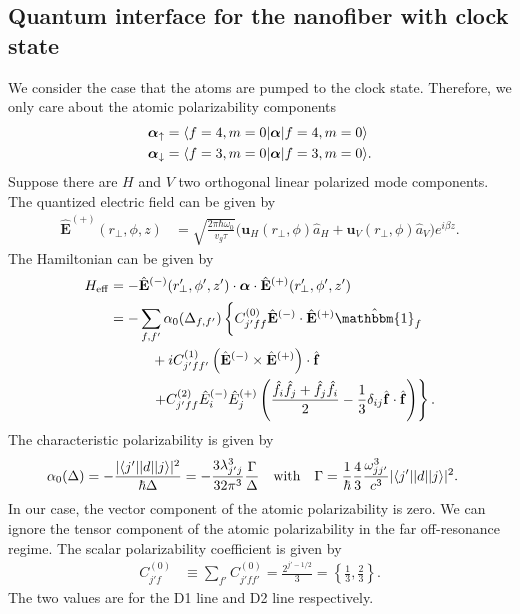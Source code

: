 \documentclass[preprint,aps,pra,onecolumn]{revtex4-1} %
\renewcommand{\tensor}[1]{\boldsymbol{#1}}
\begin{document}
\subsection{Quantum interface for the nanofiber with clock state}
We consider the case that the atoms are pumped to the clock state. Therefore, we only care about the atomic polarizability components
\begin{align}
\tensor{\alpha}_{\uparrow} &=\bra{f=4,m=0}\tensor{\alpha}\ket{f=4,m=0}\\
\tensor{\alpha}_{\downarrow} &=\bra{f=3,m=0}\tensor{\alpha}\ket{f=3,m=0}.
\end{align}
Suppose there are $H$ and $V$ two orthogonal linear polarized mode components. The quantized electric field can be given by
\begin{align}
\hat{\mathbf{E}}^{(+)}(r\!_\perp,\phi,z) &= \sqrt{ \frac{2 \pi \hbar \omega_0}{ v_g \tau} } \big( \mathbf{u}_H(r\!_\perp,\phi) \hat{a}_H + \mathbf{u}_V(r\!_\perp,\phi) \hat{a}_V \big) e^{i \beta z}.
\end{align}
The Hamiltonian can be given by
\begin{align}
H_{\rm eff}   &= -\hat{\mathbf{E}}^{(-)}(r^\prime\!\!_\perp,\phi',z')\cdot \tensor{\alpha}\cdot \hat{\mathbf{E}}^{(+)}(r^\prime\!\!_\perp,\phi',z')\\
 &=- \sum_{f,f'}\alpha_0(\Delta_{f,f'}) \left\{ C_{j'ff}^{(0)} \hat{\mathbf{E}}^{(-)} \cdot \hat{\mathbf{E}}^{(+)} \hat{\mathbbm{1}}_f \phantom{\frac{\hat{1}}{1}}\right. \nonumber\\
&\quad\quad\quad + i C_{j'ff'}^{(1)} \left(\hat{\mathbf{E}}^{(-)} \times \hat{\mathbf{E}}^{(+)} \right) \cdot \hat{ \mathbf{f}} \nonumber\\
&\quad\quad\quad  \left. + C_{j'ff}^{(2)} \hat{E}_i^{(-)} \hat{E}_j^{(+)} \left( \frac{ \hat{f}_i \hat{f}_j  + \hat{f}_j \hat{f}_i  }{2} - \frac{1}{3}\delta_{ij} \hat{ \mathbf{f}} \cdot \hat{\mathbf{f}}  \right) \right\}. 
\end{align}
The characteristic polarizability is given by
\begin{align} \label{Eq::alpha0}
\alpha_0(\Delta) & =  -\frac{|  \langle{ j' }\rvert| d | \lvert{ j }\rangle |^2}{\hbar \Delta } = - \frac{3 \lambda_{j' j}^3}{32 \pi^3} \frac{ \Gamma }{ \Delta }\quad \text{with}\quad 
\Gamma = \frac{1}{\hbar} \frac{4}{3} \frac{\omega_{j j'}^3}{c^3} | \langle{ j' }\rvert| d | \lvert{ j }\rangle |^2.
\end{align}
In our case, the vector component of the atomic polarizability is zero. We can ignore the tensor component of the atomic polarizability in the far off-resonance regime. The scalar polarizability coefficient is given by
\begin{align} \label{Eq::alpha0}
C_{j' f}^{(0)} &\equiv \sum_{f'} C_{j' f f'}^{(0)} =   \frac{2^{j'-1/2}}{3} =\left\{ \frac{1}{3},\frac{2}{3}\right\}.
\end{align}
The two values are for the D1 line and D2 line respectively.
\end{document}
